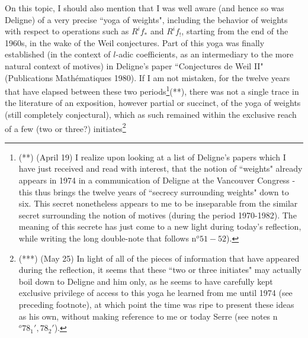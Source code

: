 On this topic, I should also mention that I was well aware (and hence so was Deligne) of a very precise ``yoga of weights", including the behavior of weights with respect to operations such as $R^if_*$ and $R^if_!$, starting from the end of the 1960s, in the wake of the Weil conjectures. Part of this yoga was finally established (in the context of $l$-adic coefficients, as an intermediary to the more natural context of motives) in Deligne's paper ``Conjectures de Weil II" (Publications Math\'ematiques 1980). If I am not mistaken, for the twelve years that have elapsed between these two periods\footnote{(**) (April 19) I realize upon looking at a list of Deligne's papers which I have just received and read with interest, that the notion of ``weights" already appears in 1974 in a communication of Deligne at the Vancouver Congress - this thus brings the twelve years of ``secrecy surrounding weights" down to six. This secret nonetheless appears to me to be inseparable from the similar secret surrounding the notion of motives (during the period 1970-1982). The meaning of this secrete has just come to a new light during today's reflection, while writing the long double-note that follows n$^o 51-52$).}(**), there was not a single trace in the literature of an exposition, however partial or succinct, of the yoga of weights (still completely conjectural), which as such remained within the exclusive reach of a few (two or three?) initiates\footnote{(***) (May 25) In light of all of the pieces of information that have appeared during the reflection, it seems that these ``two or three initiates" may actually boil down to Deligne and him only, as he seems to have carefully kept exclusive privilege of access to this yoga he learned from me until 1974 (see preceding footnote), at which point the time was ripe to present these ideas as his own, without making reference to me or today Serre (see notes n$^o 78_1', 78_2'$).

}
